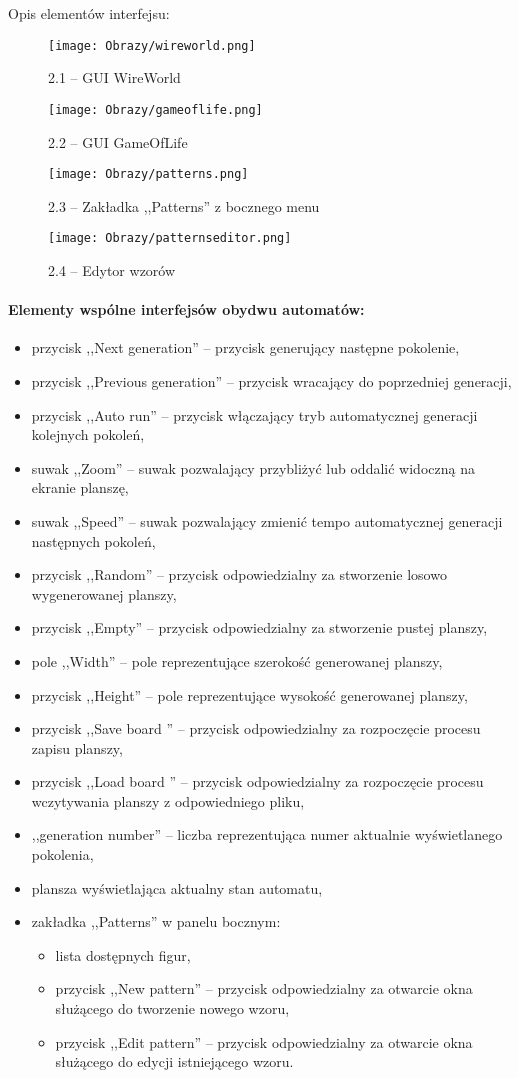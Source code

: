 \documentclass{mwart}
\begin{document}
Opis elementów interfejsu:

\begin{figure}[H]
	\centering
	\def\svgwidth{\columnwidth}
	\texttt{[image: Obrazy/wireworld.png]}
	\caption{2.1 -- GUI WireWorld}
	\texttt{[image: Obrazy/gameoflife.png]}
	\caption{2.2 -- GUI GameOfLife}
	\texttt{[image: Obrazy/patterns.png]}
	\caption{2.3 -- Zakładka ,,Patterns'' z bocznego menu}
	\texttt{[image: Obrazy/patternseditor.png]}
	\caption{2.4 -- Edytor wzorów}
\end{figure}

\paragraph{Elementy wspólne interfejsów obydwu automatów:}
\begin{itemize}
	\item przycisk ,,Next generation'' -- przycisk generujący następne pokolenie,
	\item przycisk ,,Previous generation'' -- przycisk wracający do poprzedniej generacji,
	\item przycisk ,,Auto run'' -- przycisk włączający tryb automatycznej generacji kolejnych pokoleń,
	\item suwak ,,Zoom'' -- suwak pozwalający przybliżyć lub oddalić widoczną na ekranie planszę,
	\item suwak ,,Speed'' -- suwak pozwalający zmienić tempo automatycznej generacji następnych pokoleń,
	\item przycisk ,,Random'' -- przycisk odpowiedzialny za stworzenie losowo wygenerowanej planszy,
	\item przycisk ,,Empty'' -- przycisk odpowiedzialny za stworzenie pustej planszy,
	\item pole ,,Width'' -- pole reprezentujące szerokość generowanej planszy,
	\item przycisk ,,Height'' -- pole reprezentujące wysokość generowanej planszy,
	\item przycisk ,,Save board '' -- przycisk odpowiedzialny za rozpoczęcie procesu zapisu planszy,
	\item przycisk ,,Load board '' -- przycisk odpowiedzialny za rozpoczęcie procesu wczytywania planszy z odpowiedniego pliku,
	\item ,,generation number'' -- liczba reprezentująca numer aktualnie wyświetlanego pokolenia,
	\item plansza wyświetlająca aktualny stan automatu,
	\item zakładka ,,Patterns'' w panelu bocznym:
	\begin{itemize}
		\item lista dostępnych figur,
		\item przycisk ,,New pattern'' -- przycisk odpowiedzialny za otwarcie okna służącego do tworzenie nowego wzoru,
		\item przycisk ,,Edit pattern'' -- przycisk odpowiedzialny za otwarcie okna służącego do edycji istniejącego wzoru.
	\end{itemize}
\end{itemize}
\end{document}
